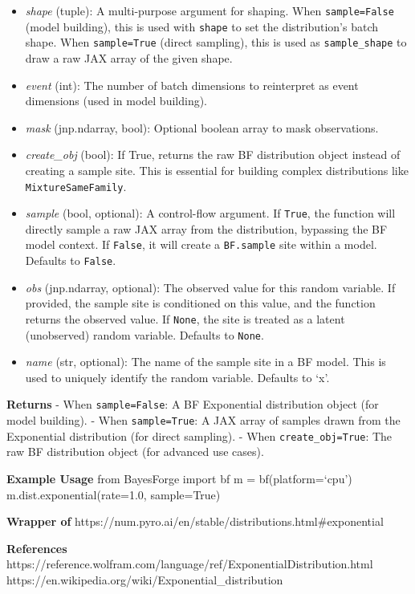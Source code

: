 \documentclass[
  letterpaper,
  DIV=11,
  numbers=noendperiod]{scrartcl}
\begin{document}
\begin{itemize}
\item
  \emph{shape} (tuple): A multi-purpose argument for shaping. When
  \texttt{sample=False} (model building), this is used with
  \texttt{shape} to set the distribution's batch shape. When
  \texttt{sample=True} (direct sampling), this is used as
  \texttt{sample\_shape} to draw a raw JAX array of the given shape.
\item
  \emph{event} (int): The number of batch dimensions to reinterpret as
  event dimensions (used in model building).
\item
  \emph{mask} (jnp.ndarray, bool): Optional boolean array to mask
  observations.
\item
  \emph{create\_obj} (bool): If True, returns the raw BF distribution
  object instead of creating a sample site. This is essential for
  building complex distributions like \texttt{MixtureSameFamily}.
\item
  \emph{sample} (bool, optional): A control-flow argument. If
  \texttt{True}, the function will directly sample a raw JAX array from
  the distribution, bypassing the BF model context. If \texttt{False},
  it will create a \texttt{BF.sample} site within a model. Defaults to
  \texttt{False}.
\item
  \emph{obs} (jnp.ndarray, optional): The observed value for this random
  variable. If provided, the sample site is conditioned on this value,
  and the function returns the observed value. If \texttt{None}, the
  site is treated as a latent (unobserved) random variable. Defaults to
  \texttt{None}.
\item
  \emph{name} (str, optional): The name of the sample site in a BF
  model. This is used to uniquely identify the random variable. Defaults
  to `x'.
\end{itemize}

\textbf{Returns} - When \texttt{sample=False}: A BF Exponential
distribution object (for model building). - When \texttt{sample=True}: A
JAX array of samples drawn from the Exponential distribution (for direct
sampling). - When \texttt{create\_obj=True}: The raw BF distribution
object (for advanced use cases).

\textbf{Example Usage} from BayesForge import bf m = bf(platform=`cpu')
m.dist.exponential(rate=1.0, sample=True)

\textbf{Wrapper of}
https://num.pyro.ai/en/stable/distributions.html\#exponential

\textbf{References}
https://reference.wolfram.com/language/ref/ExponentialDistribution.html
https://en.wikipedia.org/wiki/Exponential\_distribution
\end{document}
